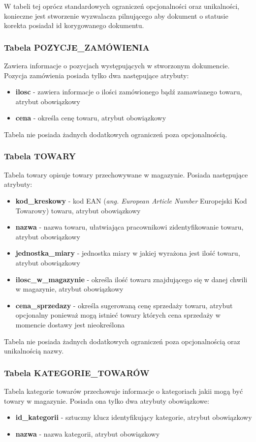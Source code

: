 W tabeli tej oprócz standardowych ograniczeń opcjonalności oraz unikalności,
konieczne jest stworzenie wyzwalacza pilnującego aby dokument o statusie korekta
posiadał id korygowanego dokumentu.

\subsubsection{Tabela POZYCJE\_ZAMÓWIENIA}
Zawiera informacje o pozycjach występujących w stworzonym dokumencie. Pozycja
zamówienia posiada tylko dwa następujące atrybuty:
\begin{itemize}
  \item \textbf{ilosc} - zawiera informacje o ilości zamówionego bądź
  zamawianego towaru, atrybut obowiązkowy
  \item \textbf{cena} - określa cenę towaru, atrybut obowiązkowy
\end{itemize} 

Tabela nie posiada żadnych dodatkowych ograniczeń poza opcjonalnością.

\subsubsection{Tabela TOWARY}
Tabela towary opisuje towary przechowywane w magazynie. Posiada następujące
atrybuty:
\begin{itemize}
  \item \textbf{kod\_kreskowy} - kod EAN (\textit{ang. European Article
  Number} Europejski Kod Towarowy) towaru, atrybut obowiązkowy
  \item \textbf{nazwa} - nazwa towaru, ułatwiająca pracownikowi zidentyfikowanie
  towaru, atrybut obowiązkowy
  \item \textbf{jednostka\_miary} - jednostka miary w jakiej wyrażona jest ilość
  towaru, atrybut obowiązkowy
  \item \textbf{ilosc\_w\_magazynie} - określa ilość towaru znajdującego się w
  danej chwili w magazynie, atrybut obowiązkowy
  \item \textbf{cena\_sprzedazy} - określa sugerowaną cenę sprzedaży towaru,
  atrybut opcjonalny ponieważ mogą istnieć towary których cena sprzedaży w
  momencie dostawy jest nieokreślona
\end{itemize}

Tabela nie posiada żadnych dodatkowych ograniczeń poza opcjonalnością oraz
unikalnością nazwy.

\subsubsection{Tabela KATEGORIE\_TOWARÓW}
Tabela kategorie towarów przechowuje informacje o  kategoriach jakii mogą być
towary w magazynie.
Posiada ona tylko dwa atrybuty obowiązkowe:
\begin{itemize}
  \item \textbf{id\_kategorii} - sztuczny klucz identyfikujący kategorie,
  atrybut obowiązkowy
  \item \textbf{nazwa} - nazwa kategorii, atrybut obowiązkowy
\end{itemize}

